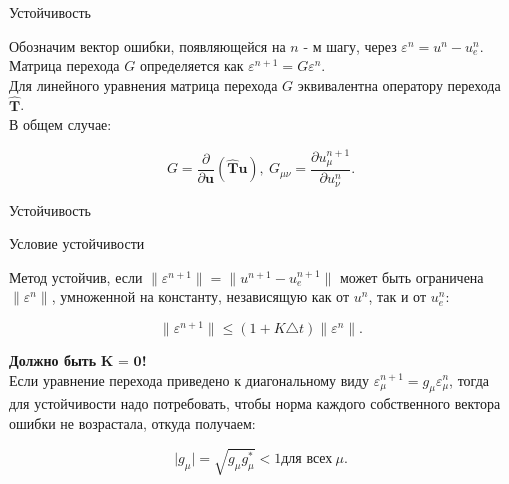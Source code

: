 \documentclass[10pt,xcolor=pst,aspectratio=169]{beamer}
\begin{document}
\begin{frame}{Устойчивость}

	\transdissolve[duration=0.1]
	\justifying
	\large

	Обозначим вектор ошибки, появляющейся на $n$ - м шагу, через $\varepsilon^{n} = u^{n} - u^{n}_{e}$.\\

	Матрица перехода $G$ определяется как $\varepsilon^{n + 1} = G \varepsilon^{n}$.\\

	Для линейного уравнения матрица перехода $G$ эквивалентна оператору перехода $\hat{\textbf{T}}$.\\

	В общем случае:

	\[
		G = \frac{\partial}{\partial \textbf{u}} \left( \hat{\textbf{T}} \textbf{u} \right), \: G_{\mu \nu} = \frac{\partial u^{n + 1}_{\mu}}{\partial u^{n}_{\nu}}.
	\]

\end{frame}

\begin{frame}{Устойчивость}

	\transdissolve[duration=0.1]
	\justifying
	\large

	\begin{block}{Условие устойчивости}

		Метод устойчив, если $\parallel \varepsilon^{n + 1} \parallel = \parallel u^{n + 1} - u^{n + 1}_{e} \parallel$ может быть ограничена $\parallel \varepsilon^{n} \parallel$, умноженной на константу, независящую как от $u^{n}$, так и от $ u^{n}_{e}$:

		\[
			\parallel \varepsilon^{n + 1} \parallel \leq \left( 1 + K \triangle t \right) \parallel \varepsilon^{n} \parallel.
		\]

	\end{block}

	\textbf{Должно быть} $\textbf{K = 0}$\textbf{!}\\

	Если уравнение перехода приведено к диагональному виду $\varepsilon^{n + 1}_{\mu} = g_{\mu} \varepsilon^{n}_{\mu}$, тогда для устойчивости надо потребовать, чтобы норма каждого собственного вектора ошибки не возрастала, откуда получаем:

	\[
		\vert g_{\mu} \vert = \sqrt{ g_{\mu}  g^{*}_{\mu}} < 1 \mbox{для всех} \: \mu.
	\]

\end{frame}
\end{document}
